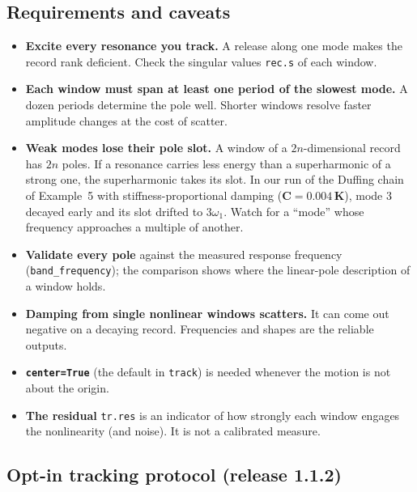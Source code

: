 \documentclass[report]{nld}
\theoremstyle{remark}\newtheorem*{remark}{Remark}
\newcommand{\code}[1]{\texttt{#1}}
\begin{document}
\subsection{Requirements and caveats}

\begin{itemize}
  \item \textbf{Excite every resonance you track.} A release along one mode makes
    the record rank deficient. Check the singular values \code{rec.s} of each window.
  \item \textbf{Each window must span at least one period of the slowest mode.}
    A dozen periods determine the pole well. Shorter windows resolve faster
    amplitude changes at the cost of scatter.
  \item \textbf{Weak modes lose their pole slot.} A window of a $2n$-dimensional
    record has $2n$ poles. If a resonance carries less energy than a
    superharmonic of a strong one, the superharmonic takes its slot. In our run
    of the Duffing chain of Example~5 with stiffness-proportional damping
    ($\mathbf{C}=0.004\,\mathbf{K}$), mode 3 decayed early and its slot drifted
    to $3\omega_1$. Watch for a ``mode'' whose frequency
    approaches a multiple of another.
  \item \textbf{Validate every pole} against the measured response frequency
    (\code{band\_frequency}); the comparison shows where the linear-pole
    description of a window holds.
  \item \textbf{Damping from single nonlinear windows scatters.} It can come out
    negative on a decaying record. Frequencies and shapes are the reliable outputs.
  \item \textbf{\code{center=True}} (the default in \code{track}) is needed whenever
    the motion is not about the origin.
  \item \textbf{The residual} \code{tr.res} is an indicator of how strongly
    each window engages the nonlinearity (and noise). It is not a calibrated measure.
\end{itemize}

\subsection{Opt-in tracking protocol (release 1.1.2)}\label{sec:track112}
\end{document}
